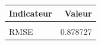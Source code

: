 \centering
\centering
\begin{tabular}[t]{lr}
\toprule
Indicateur & Valeur\\
\midrule
\cellcolor{gray!10}{EQM} & \cellcolor{gray!10}{0.772160}\\
RMSE & 0.878727\\
\bottomrule
\end{tabular}


